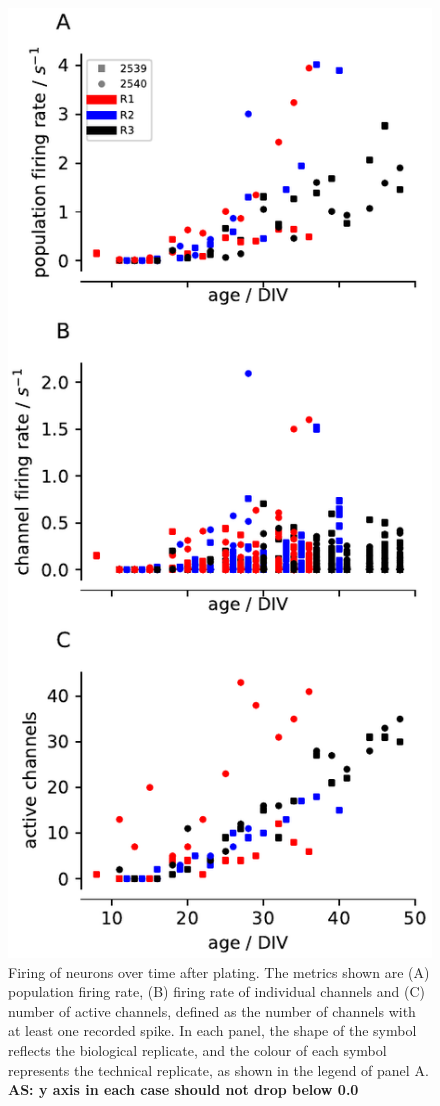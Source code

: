 \documentclass[doublespacing]{bmcart}
\begin{document}
\begin{backmatter}
\begin{figure}[h!]
    \includegraphics{../plots/development_plots.pdf}
	\caption{Firing of neurons over time after plating. The metrics shown are (A) population firing rate, (B) firing rate of individual channels and (C) number of active channels, defined as the number of channels with at least one recorded spike.  In each panel, the shape of the symbol reflects the biological replicate, and the colour of each symbol represents the technical replicate, as shown in the legend of panel A. \textbf{AS: y axis in each case should not drop below 0.0}}
	\label{fig:development}
\end{figure}



\end{backmatter}
\end{document}
